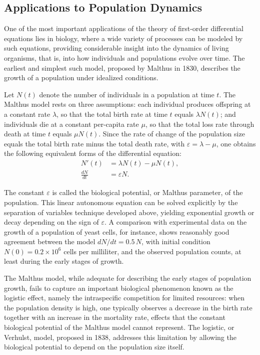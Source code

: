 \subsection{Applications to Population Dynamics}


One of the most important applications of the theory of first-order differential equations lies in biology, where a wide variety of processes can be modeled by such equations, providing considerable insight into the dynamics of living organisms, that is, into how individuals and populations evolve over time. The earliest and simplest such model, proposed by Malthus in 1830, describes the growth of a population under idealized conditions.

Let $N(t)$ denote the number of individuals in a population at time $t$. The Malthus model rests on three assumptions: each individual produces offspring at a constant rate $\lambda$, so that the total birth rate at time $t$ equals $\lambda N(t)$; and individuals die at a constant per-capita rate $\mu$, so that the total loss rate through death at time $t$ equals $\mu N(t)$. Since the rate of change of the population size equals the total birth rate minus the total death rate, with $\varepsilon = \lambda - \mu$, one obtains the following equivalent forms of the differential equation:
\[
\begin{aligned}
N'(t) &= \lambda N(t) - \mu N(t), \\
\frac{dN}{dt} &= \varepsilon N.
\end{aligned}
\]

The constant $\varepsilon$ is called the biological potential, or Malthus parameter, of the population. This linear autonomous equation can be solved explicitly by the separation of variables technique developed above, yielding exponential growth or decay depending on the sign of $\varepsilon$. A comparison with experimental data on the growth of a population of yeast cells, for instance, shows reasonably good agreement between the model $dN/dt = 0.5\, N$, with initial condition $N(0) = 0.2 \times 10^6$ cells per milliliter, and the observed population counts, at least during the early stages of growth.


The Malthus model, while adequate for describing the early stages of population growth, fails to capture an important biological phenomenon known as the logistic effect, namely the intraspecific competition for limited resources: when the population density is high, one typically observes a decrease in the birth rate together with an increase in the mortality rate, effects that the constant biological potential of the Malthus model cannot represent. The logistic, or Verhulst, model, proposed in 1838, addresses this limitation by allowing the biological potential to depend on the population size itself.

